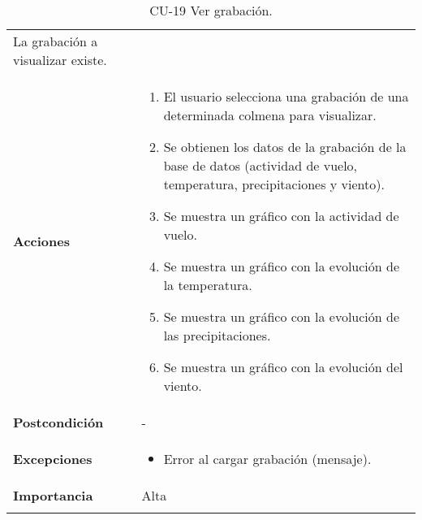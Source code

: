 \begin{longtable}[H]{@{}ll@{}}
\begin{minipage}[t]{0.68\columnwidth}
La grabación a visualizar existe.\strut
\end{minipage}\tabularnewline
\begin{minipage}[t]{0.26\columnwidth}\raggedright\strut
\textbf{Acciones}\strut
\end{minipage} & \begin{minipage}[t]{0.68\columnwidth}\raggedright\strut
\begin{enumerate}
\def\labelenumi{\arabic{enumi}.}
\tightlist
\item
  El usuario selecciona una grabación de una determinada colmena para
  visualizar.
\item
  Se obtienen los datos de la grabación de la base de datos (actividad
  de vuelo, temperatura, precipitaciones y viento).
\item
  Se muestra un gráfico con la actividad de vuelo.
\item
  Se muestra un gráfico con la evolución de la temperatura.
\item
  Se muestra un gráfico con la evolución de las precipitaciones.
\item
  Se muestra un gráfico con la evolución del viento.
\end{enumerate}\strut
\end{minipage}\tabularnewline
\begin{minipage}[t]{0.26\columnwidth}\raggedright\strut
\textbf{Postcondición}\strut
\end{minipage} & \begin{minipage}[t]{0.68\columnwidth}\raggedright\strut
-\strut
\end{minipage}\tabularnewline
\begin{minipage}[t]{0.26\columnwidth}\raggedright\strut
\textbf{Excepciones}\strut
\end{minipage} & \begin{minipage}[t]{0.68\columnwidth}\raggedright\strut
\begin{itemize}
\tightlist
\item
  Error al cargar grabación (mensaje).
\end{itemize}\strut
\end{minipage}\tabularnewline
\begin{minipage}[t]{0.26\columnwidth}\raggedright\strut
\textbf{Importancia}\strut
\end{minipage} & \begin{minipage}[t]{0.68\columnwidth}\raggedright\strut
Alta\strut
\end{minipage}\tabularnewline
\bottomrule
\caption{CU-19 Ver grabación.}
\end{longtable}

